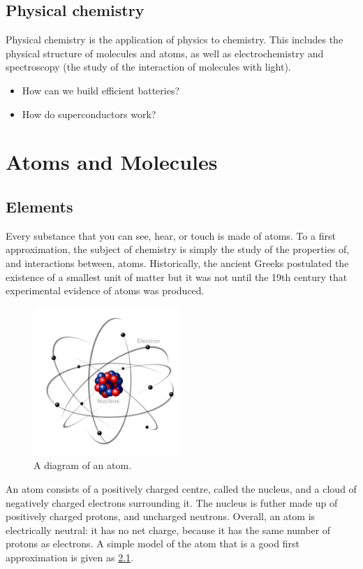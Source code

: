 \documentclass[a4paper]{memoir}
\begin{document}
\section{Physical chemistry}
Physical chemistry is the application of physics to chemistry. This includes the physical structure of molecules and atoms, as well as
electrochemistry and spectroscopy (the study of the interaction of molecules with light).
\begin{itemize}
  \item How can we build efficient batteries?
  \item How do superconductors work?
\end{itemize}

\chapter{Atoms and Molecules}
\section{Elements}
Every substance that you can see, hear, or touch is made of atoms. To a first approximation, the subject of chemistry is simply the
study of the properties of, and interactions between, atoms. Historically, the ancient Greeks postulated the existence of a smallest
unit of matter but it was not until the 19th century that experimental evidence of atoms was produced.

\begin{figure}
  \centering
  \includegraphics[width=0.5\textwidth]{atom}
  \caption{A diagram of an atom.\label{fig:atom}}
\end{figure}

An atom consists of a positively charged centre, called the nucleus, and a cloud of negatively charged electrons surrounding it. The nucleus is
futher made up of positively charged protons, and uncharged neutrons. Overall, an atom is electrically neutral: it has no net charge, because it
has the same number of protons as electrons. A simple model of the atom that is a good first approximation is given as \cref{fig:atom}.
\end{document}
